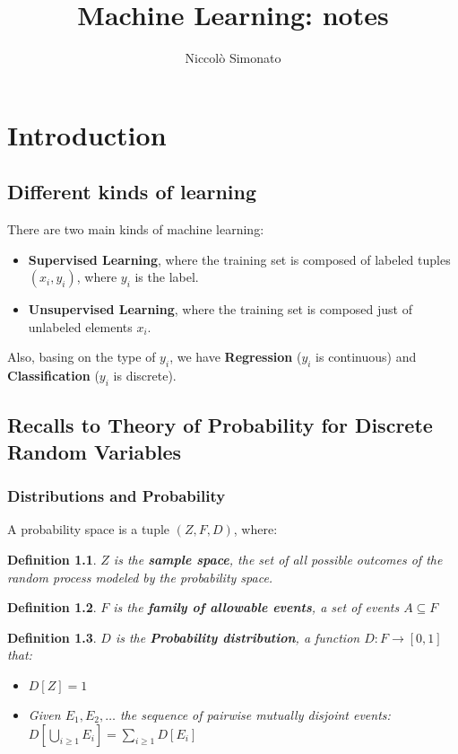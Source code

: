 \documentclass[12pt, a4paper, english]{report}
\author{Niccolò Simonato}
\title{Machine Learning: notes}
\newtheorem{definition}{Definition}
\begin{document}
\maketitle

\tableofcontents

\chapter{Introduction}
\section{Different kinds of learning}
There are two main kinds of machine learning:
\begin{itemize}
    \item \textbf{Supervised Learning}, where the training set is composed of labeled tuples $(x_{i},y_{i})$, where $y_{i}$ is the label.
    \item \textbf{Unsupervised Learning}, where the training set is composed just of unlabeled elements $x_{i}$.
\end{itemize}
Also, basing on the type of $y_{i}$, we have \textbf{Regression} ($y_{i}$ is continuous) and
\textbf{Classification} ($y_{i}$ is discrete).
\section{Recalls to Theory of Probability for Discrete Random Variables}
\subsection{Distributions and Probability}
A probability space is a tuple $(Z, F, D)$, where:
\begin{definition}
    $Z$ is the \textbf{sample space}, the set of all possible outcomes
of the random process modeled by the probability space.
\end{definition}
\begin{definition}
    $F$ is the \textbf{family of allowable events}, a set of events $A \subseteq F$
\end{definition}
\begin{definition}
    $D$ is the \textbf{Probability distribution}, a function $D: F \rightarrow [0,1]$ that:
    \begin{itemize}
        \item $D[Z] = 1$
        \item Given $E_{1}, E_{2}, \dots$ the sequence of pairwise mutually disjoint events:
        $D[\bigcup_{i \geq 1} E_{i}] = \sum_{i \geq 1} D[E_{i}]$
    \end{itemize}
\end{definition}
\end{document}
